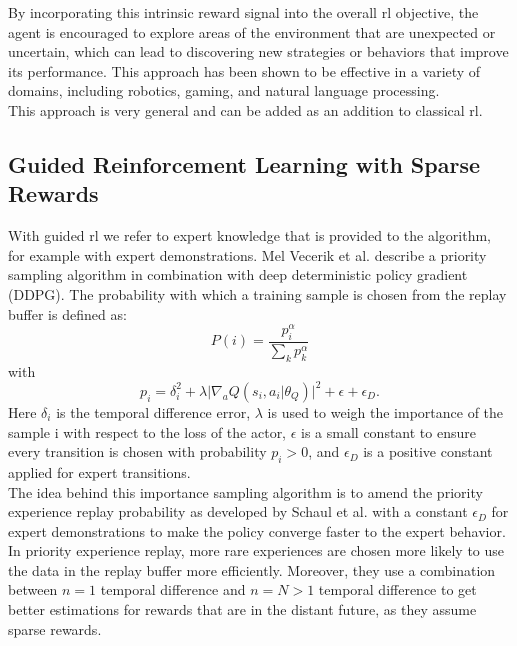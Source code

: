 By incorporating this intrinsic reward signal into the overall \ac{rl} objective, the agent is encouraged to explore areas of the environment that are 
unexpected or uncertain, which can lead to discovering new strategies or behaviors that improve its performance. This approach has been shown to be effective in a variety of 
domains, including robotics, gaming, and natural language processing.\\

This approach is very general and can be added as an addition to classical \ac{rl}.

\subsection{Guided Reinforcement Learning with Sparse Rewards}
\label{sec:rel_work_finetuning}
With guided \ac{rl} we refer to expert knowledge that is provided to the algorithm, for example with expert demonstrations.
Mel Vecerik et al. \cite{vecerik2018leveraging} describe a priority 
sampling algorithm in combination with deep deterministic policy gradient (DDPG). The probability with which a 
training sample is chosen from the replay buffer is defined as: 
\begin{equation}
    P(i) = \frac{p_i^\alpha}{\sum\limits_{k} p_k^\alpha}
\end{equation}
with 
\begin{equation}
    p_i = \delta_{i}^2 + \lambda \lvert \nabla_a Q(s_i, a_i \vert \theta_Q) \rvert^2 + \epsilon + \epsilon_{D}.
\end{equation}
Here $\delta_{i}$ is the temporal difference error, $\lambda$ is used to weigh the importance of the sample i with respect to the loss of the actor, 
$\epsilon$ is a small constant to ensure every transition is chosen with probability $p_i > 0$, and $\epsilon_D$ is a positive constant applied for expert transitions.\\
The idea behind this importance sampling algorithm is to amend the priority experience replay probability as developed by Schaul et al. \cite{schaul2016prioritized} 
with a constant $\epsilon_{D}$ for expert demonstrations to make the policy converge faster to the expert behavior. In priority experience replay, more rare 
experiences are chosen more likely to use the data in the replay buffer more efficiently. Moreover, they use a combination between $n=1$ temporal difference and 
$n=N > 1$ temporal difference to get better estimations for rewards that are in the distant future, as they assume sparse rewards.\\
